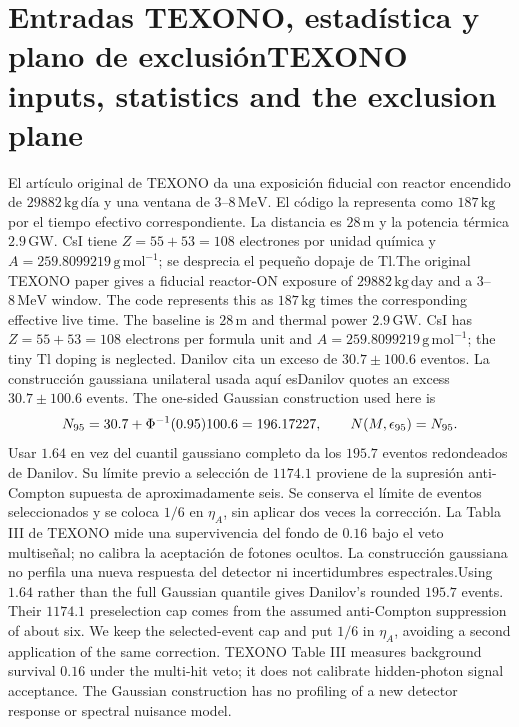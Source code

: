 \documentclass[11pt]{article}
\newcommand{\B}[2]{\ifspanish#2\else#1\fi}
\begin{document}
\section{\B{TEXONO inputs, statistics and the exclusion plane}{Entradas TEXONO, estadística y plano de exclusión}}
\B{The original TEXONO paper\cite{texono} gives a fiducial reactor-ON exposure of $29882\,\mathrm{kg\,day}$ and a $3$--$8\,\mathrm{MeV}$ window. The code represents this as $187\,\mathrm{kg}$ times the corresponding effective live time. The baseline is $28\,\mathrm m$ and thermal power $2.9\,\mathrm{GW}$. CsI has $Z=55+53=108$ electrons per formula unit and $A=259.8099219\,\mathrm{g\,mol^{-1}}$; the tiny Tl doping is neglected.}
{El artículo original de TEXONO\cite{texono} da una exposición fiducial con reactor encendido de $29882\,\mathrm{kg}\,\text{día}$ y una ventana de $3$--$8\,\mathrm{MeV}$. El código la representa como $187\,\mathrm{kg}$ por el tiempo efectivo correspondiente. La distancia es $28\,\mathrm m$ y la potencia térmica $2.9\,\mathrm{GW}$. CsI tiene $Z=55+53=108$ electrones por unidad química y $A=259.8099219\,\mathrm{g\,mol^{-1}}$; se desprecia el pequeño dopaje de Tl.}
\B{Danilov quotes an excess $30.7\pm100.6$ events. The one-sided Gaussian construction used here is}
{Danilov cita un exceso de $30.7\pm100.6$ eventos. La construcción gaussiana unilateral usada aquí es}
\begin{equation}
N_{95}=30.7+\Phi^{-1}(0.95)100.6=196.17227,\qquad N(M,\epsilon_{95})=N_{95}.
\end{equation}
\B{Using $1.64$ rather than the full Gaussian quantile gives Danilov's rounded $195.7$ events. Their $1174.1$ preselection cap comes from the assumed anti-Compton suppression of about six. We keep the selected-event cap and put $1/6$ in $\eta_A$, avoiding a second application of the same correction. TEXONO Table III measures background survival $0.16$ under the multi-hit veto; it does not calibrate hidden-photon signal acceptance. The Gaussian construction has no profiling of a new detector response or spectral nuisance model.}
{Usar $1.64$ en vez del cuantil gaussiano completo da los $195.7$ eventos redondeados de Danilov. Su límite previo a selección de $1174.1$ proviene de la supresión anti-Compton supuesta de aproximadamente seis. Se conserva el límite de eventos seleccionados y se coloca $1/6$ en $\eta_A$, sin aplicar dos veces la corrección. La Tabla III de TEXONO mide una supervivencia del fondo de $0.16$ bajo el veto multiseñal; no calibra la aceptación de fotones ocultos. La construcción gaussiana no perfila una nueva respuesta del detector ni incertidumbres espectrales.}
\end{document}
